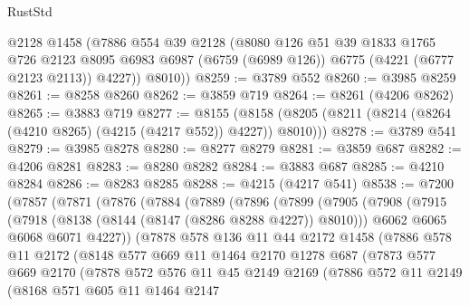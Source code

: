 \begin{lexlean}{RustStd}
\begin{coremodule}
{\begin{coremodule}
{{{{{{{{{{{{{{{{{{{{{{{{{{{{{{{        @2128
        @1458
        (@7886
          @554
          @39
          @2128
          (@8080
            @126
            @51
            @39
            @1833
            @1765
            @726
            @2123
            @8095
            @6983
            @6987
            (@6759 (@6989 @126))
            @6775
            (@4221 (@6777 @2123 @2113))
            @4227))
        @8010))
@8259 := @3789 @552
@8260 := @3985 @8259
@8261 := @8258 @8260
@8262 := @3859 @719
@8264 := @8261 (@4206 @8262)
@8265 := @3883 @719
@8277 := @8155
    (@8158 (@8205 (@8211 (@8214 (@8264 (@4210 @8265) (@4215 (@4217 @552)) @4227)) @8010)))
@8278 := @3789 @541
@8279 := @3985 @8278
@8280 := @8277 @8279
@8281 := @3859 @687
@8282 := @4206 @8281
@8283 := @8280 @8282
@8284 := @3883 @687
@8285 := @4210 @8284
@8286 := @8283 @8285
@8288 := @4215 (@4217 @541)
@8538 := @7200
    (@7857
      (@7871
        (@7876
          (@7884
            (@7889
              (@7896
                (@7899
                  (@7905
                    (@7908
                      (@7915
                        (@7918 (@8138 (@8144 (@8147 (@8286 @8288 @4227)) @8010)))
                        @6062
                        @6065
                        @6068
                        @6071
                        @4227))
                    (@7878
                      @578
                      @136
                      @11
                      @44
                      @2172
                      @1458
                      (@7886
                        @578
                        @11
                        @2172
                        (@8148
                          @577
                          @669
                          @11
                          @1464
                          @2170
                          @1278
                          @687
                          (@7873
                            @577
                            @669
                            @2170
                            (@7878
                              @572
                              @576
                              @11
                              @45
                              @2149
                              @2169
                              (@7886
                                @572
                                @11
                                @2149
                                (@8168
                                  @571
                                  @605
                                  @11
                                  @1464
                                  @2147
}}}}}}}}}}}}}}}}}}}}}}}}}}}}}}}
\end{coremodule}}
\end{coremodule}
\end{lexlean}
